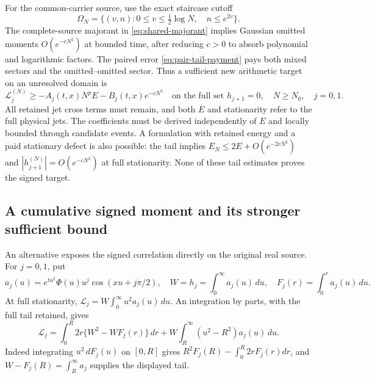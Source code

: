 \documentclass[11pt]{article}
\numberwithin{equation}{section}
\theoremstyle{definition}
\theoremstyle{remark}
\newcommand{\Lag}{\mathcal L}
\begin{document}
For the common-carrier source, use the exact staircase cutoff
\[
 \Omega_N=\{(v,n):0\le v\le\tfrac12\log N,\quad n\le e^{2v}\}.
\]
The complete-source majorant in \eqref{eq:shared-majorant} implies
Gaussian omitted moments $O(e^{-cN^2})$ at bounded time, after reducing
$c>0$ to absorb polynomial and logarithmic factors.  The paired error
\eqref{eq:pair-tail-payment} pays both mixed sectors and the
omitted--omitted sector.  Thus a sufficient new arithmetic target on an
unresolved domain is
\begin{equation}
 \Lag_j^{(N)}\ge-A_j(t,x)N^pE-B_j(t,x)e^{-cN^2}
 \quad\text{on the full set }h_{j+1}=0,
 \quad N\ge N_0,\quad j=0,1.
 \label{eq:inner-signed-cutoff-target}
\end{equation}
All retained jet cross terms must remain, and both $E$ and stationarity
refer to the full physical jets.  The coefficients must be derived
independently of $E$ and locally bounded through candidate events.
A formulation with retained energy and a paid stationary defect is also
possible: the tail implies $E_N\le2E+O(e^{-2cN^2})$ and
$|h_{j+1}^{(N)}|=O(e^{-cN^2})$ at full stationarity.
None of these tail estimates proves the signed target.

\subsection{A cumulative signed moment and its stronger sufficient bound}
\label{subsec:cumulative-signed-moment}

An alternative exposes the signed correlation directly on the original
real source.  For $j=0,1$, put
\[
 a_j(u)=e^{tu^2}\Phi(u)u^j\cos(xu+j\pi/2),\quad
 W=h_j=\int_0^\infty a_j(u)\,du,\quad
 F_j(r)=\int_0^r a_j(u)\,du.
\]
At full stationarity, $\Lag_j=W\int_0^\infty u^2a_j(u)\,du$.
An integration by parts, with the full tail retained, gives
\begin{equation}
 \Lag_j=\int_0^R2r\{W^2-WF_j(r)\}\,dr
       +W\int_R^\infty(u^2-R^2)a_j(u)\,du.
 \label{eq:cumulative-signed-identity}
\end{equation}
Indeed integrating $u^2\,dF_j(u)$ on $[0,R]$ gives
$R^2F_j(R)-\int_0^R2rF_j(r)dr$, and
$W-F_j(R)=\int_R^\infty a_j$ supplies the displayed tail.
\end{document}
